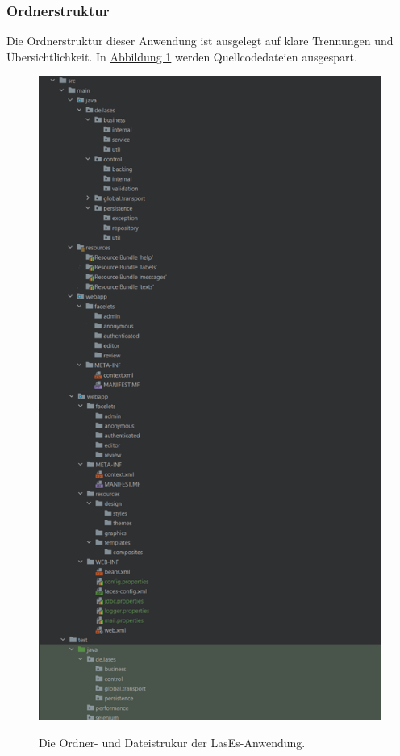 \subsubsection{Ordnerstruktur}

Die Ordnerstruktur dieser Anwendung ist ausgelegt auf klare Trennungen und Übersichtlichkeit.
In \hyperref[feinarch:orddia]{Abbildung 1} werden Quellcodedateien ausgespart.

\begin{figure}[H]
    \centering
    \includegraphics[width=0.8\linewidth]{graphics/folder_structure}\label{feinarch:orddia}
    \caption{Die Ordner- und Dateistrukur der LasEs-Anwendung.}
\end{figure}